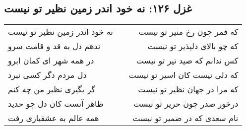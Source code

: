 \begin{center}
\section*{غزل ۱۲۶: نه خود اندر زمین نظیر تو نیست}
\label{sec:126}
\begin{longtable}{l p{0.5cm} r}
نه خود اندر زمین نظیر تو نیست
&&
که قمر چون رخ منیر تو نیست
\\
ندهم دل به قد و قامت سرو
&&
که چو بالای دلپذیر تو نیست
\\
در همه شهر ای کمان ابرو
&&
کس ندانم که صید تیر تو نیست
\\
دل مردم دگر کسی نبرد
&&
که دلی نیست کان اسیر تو نیست
\\
گر بگیری نظیر من چه کنم
&&
که مرا در جهان نظیر تو نیست
\\
ظاهر آنست کان دل چو حدید
&&
درخور صدر چون حریر تو نیست
\\
همه عالم به عشقبازی رفت
&&
نام سعدی که در ضمیر تو نیست
\\
\end{longtable}
\end{center}
